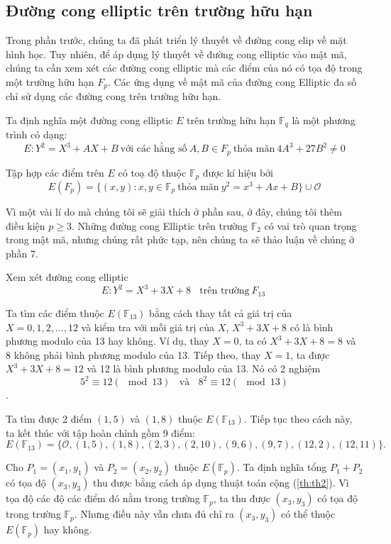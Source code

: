 \subsection{Đường cong elliptic trên trường hữu hạn}

Trong phần trước, chúng ta đã phát triển lý thuyết về đường cong elip về mặt hình học.
Tuy nhiên, để áp dụng lý thuyết về đường cong elliptic vào mật mã,
chúng ta cần xem xét các đường cong elliptic mà các điểm của nó có tọa độ trong một trường hữu hạn $F_p$.
Các ứng dụng về mật mã của đường cong Elliptic đa số chỉ sử dụng các đường
cong trên trường hữu hạn.


Ta định nghĩa một đường cong elliptic $E$ trên trường hữu hạn $\mathbb{F}_q$ là một phương trình có dạng:
$$E: Y^2 = X^3 + AX + B\ \text{với các hằng số}\ A, B \in F_p\ \text{thỏa mãn}\ 4A^3 + 27B^2 \neq 0$$


Tập hợp các điểm trên $E$ có toạ độ thuộc $\mathbb{F} _p$ được kí hiệu bởi
$$E(F_p) = \{(x, y) : x, y \in \mathbb{F}_p\ \text{thỏa mãn}\ y^2 = x^3 + A x + B\} \cup \mathcal{O}$$

\begin{remark}
	Vì một vài lí do mà chúng tôi sẽ giải thích ở phần sau, ở đây, chúng tôi thêm điều kiện $p \geq 3$.
	Những đường cong Elliptic trên trường $\mathbb{F}_2$ có vai trò quan trọng trong mật mã, nhưng chúng rất phức tạp, nên chúng ta sẽ thảo luận về chúng ở phần 7.
\end{remark}

\begin{example}
	\label{ex:ex4}
	Xem xét đường cong elliptic
	$$E: Y^2 = X^3 + 3X + 8 \ \ \ \ \text{trên trường}\  F_{13}\ $$
\end{example}

Ta tìm các điểm thuộc $E(\mathbb{F}_{13})$ bằng cách thay tất cả giá trị của $X = 0,1,2,\ldots,12$ và kiểm tra với mỗi giá trị của $X$, $X^3 + 3X + 8$ có là bình phương modulo của 13 hay không.
Ví dụ, thay $X = 0$, ta có $X^3+3X+8 = 8$ và 8 không phải bình phương modulo của 13.
Tiếp theo, thay $X = 1$, ta được $X^3+3X+8 = 12$ và 12 là bình phương modulo của 13. Nó có 2 nghiệm
$$5^2 \equiv 12 (\mod{13}) \ \ \ \ \text{và} \ \ \ \ 8^2 \equiv 12 (\mod 13)$$.

Ta tìm được 2 điểm $(1,5)$ và $(1,8)$ thuộc $E(\mathbb{F}_{13})$. Tiếp tục theo cách này, ta kết thúc với tập hoàn chỉnh gồm 9 điểm:
$$E(\mathbb{F}_{13}) = \{ \mathcal{O}, (1,5), (1,8), (2,3), (2,10), (9,6), (9,7), (12,2), (12,11)\}.$$

Cho $P_1 = (x_1, y_1)$ và $P_2 = (x_2, y_2)$ thuộc $E(\mathbb{F}_{p})$. Ta định nghĩa tổng $P_1+P_2$ có tọa độ $(x_3, y_3)$ thu được bằng cách áp dụng thuật toán cộng (\ref{th:th2}).
Vì tọa độ các độ các điểm đó nằm trong trường $\mathbb{F}_p$, ta thu được $(x_3, y_3)$ có tọa độ trong trường $\mathbb{F}_p$. Nhưng điều này vẫn chưa đủ chỉ ra
$(x_3, y_3)$ có thể thuộc $E(\mathbb{F}_{p})$ hay không.

